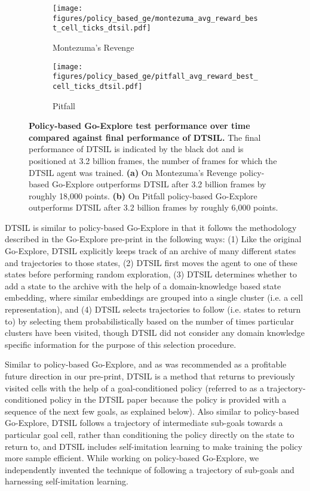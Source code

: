 \documentclass{nature}
\renewcommand*{\cite}[1]{\supercite{#1}}
\begin{document}
\begin{figure}
    \centering
    \begin{subfigure}[t]{0.45\textwidth}
        \centering
        \texttt{[image: figures/policy\_based\_ge/montezuma\_avg\_reward\_best\_cell\_ticks\_dtsil.pdf]}
        \caption{Montezuma's Revenge}
    \end{subfigure}\begin{subfigure}[t]{0.45\textwidth}
        \centering
        \texttt{[image: figures/policy\_based\_ge/pitfall\_avg\_reward\_best\_cell\_ticks\_dtsil.pdf]}
        \caption{Pitfall}
    \end{subfigure}\caption{\textbf{Policy-based Go-Explore test performance over time compared against final performance of DTSIL.} The final performance of DTSIL is indicated by the black dot and is positioned at 3.2 billion frames, the number of frames for which the DTSIL agent was trained. \textbf{(a)} On Montezuma's Revenge policy-based Go-Explore outperforms DTSIL after 3.2 billion frames by roughly 18,000 points. \textbf{(b)} On Pitfall policy-based Go-Explore outperforms DTSIL after 3.2 billion frames by roughly 6,000 points.}
    \label{fig:policy_ge_dtsil}
\end{figure}

DTSIL is similar to policy-based Go-Explore in that it follows the methodology described in the Go-Explore pre-print in the following ways: (1) Like the original Go-Explore, DTSIL explicitly keeps track of an archive of many different states and trajectories to those states, (2) DTSIL first moves the agent to one of these states before performing random exploration, (3)
DTSIL determines whether to add a state to the archive with the help of a domain-knowledge based state embedding, where similar embeddings are grouped into a single cluster (i.e. a cell representation), and (4) DTSIL selects trajectories to follow (i.e. states to return to) by selecting them probabilistically based on the number of times particular clusters have been visited, though DTSIL did not consider any domain knowledge specific information for the purpose of this selection procedure.

Similar to policy-based Go-Explore, and as was recommended as a profitable future direction in our pre-print\cite{ecoffet2019go}, DTSIL is a method that returns to previously visited cells with the help of a goal-conditioned policy (referred to as a trajectory-conditioned policy in the DTSIL paper because the policy is provided with a sequence of the next few goals, as explained below). 
Also similar to policy-based Go-Explore, DTSIL follows a trajectory of intermediate sub-goals towards a particular goal cell, rather than conditioning the policy directly on the state to return to, and DTSIL includes self-imitation learning to make training the policy more sample efficient.
While working on policy-based Go-Explore, we independently invented the technique of following a trajectory of sub-goals and harnessing self-imitation learning.
\end{document}
